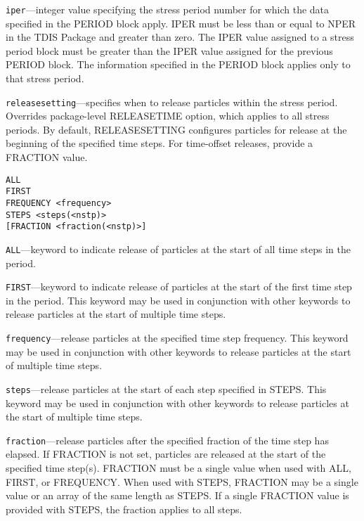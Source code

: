 \begin{description}
\item \texttt{iper}---integer value specifying the stress period number for which the data specified in the PERIOD block apply. IPER must be less than or equal to NPER in the TDIS Package and greater than zero. The IPER value assigned to a stress period block must be greater than the IPER value assigned for the previous PERIOD block. The information specified in the PERIOD block applies only to that stress period.

\item \texttt{releasesetting}---specifies when to release particles within the stress period.  Overrides package-level RELEASETIME option, which applies to all stress periods. By default, RELEASESETTING configures particles for release at the beginning of the specified time steps. For time-offset releases, provide a FRACTION value.

\begin{lstlisting}[style=blockdefinition]
ALL
FIRST
FREQUENCY <frequency>
STEPS <steps(<nstp)>
[FRACTION <fraction(<nstp)>]
\end{lstlisting}

\item \texttt{ALL}---keyword to indicate release of particles at the start of all time steps in the period.

\item \texttt{FIRST}---keyword to indicate release of particles at the start of the first time step in the period. This keyword may be used in conjunction with other keywords to release particles at the start of multiple time steps.

\item \texttt{frequency}---release particles at the specified time step frequency. This keyword may be used in conjunction with other keywords to release particles at the start of multiple time steps.

\item \texttt{steps}---release particles at the start of each step specified in STEPS. This keyword may be used in conjunction with other keywords to release particles at the start of multiple time steps.

\item \texttt{fraction}---release particles after the specified fraction of the time step has elapsed. If FRACTION is not set, particles are released at the start of the specified time step(s). FRACTION must be a single value when used with ALL, FIRST, or FREQUENCY. When used with STEPS, FRACTION may be a single value or an array of the same length as STEPS. If a single FRACTION value is provided with STEPS, the fraction applies to all steps.

\end{description}

